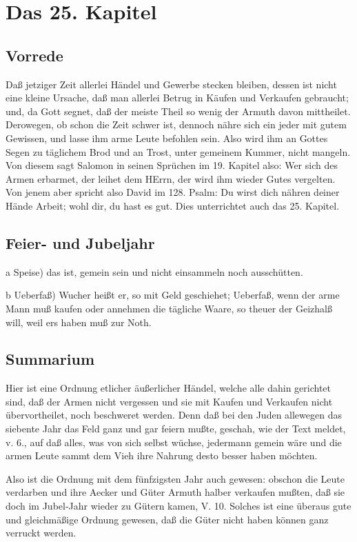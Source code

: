 \chapter{Das 25. Kapitel}

\section{Vorrede}

Daß jetziger Zeit allerlei Händel und Gewerbe stecken bleiben, dessen ist nicht eine kleine Ursache, daß man allerlei Betrug in Käufen und Verkaufen gebraucht; und, da Gott segnet, daß der meiste Theil so wenig der Armuth davon mittheilet. Derowegen, ob schon die Zeit schwer ist, dennoch nähre sich ein jeder mit gutem Gewissen, und lasse ihm arme Leute befohlen sein. Also wird ihm an Gottes Segen zu täglichem Brod und an Trost, unter gemeinem Kummer, nicht mangeln. Von diesem sagt Salomon in seinen Sprüchen im 19. Kapitel also: Wer sich des Armen erbarmet, der leihet dem HErrn, der wird ihm wieder Gutes vergelten. Von jenem aber spricht also David im 128. Psalm: Du wirst dich nähren deiner Hände Arbeit; wohl dir, du hast es gut. Dies unterrichtet auch das 25. Kapitel.

\section{Feier- und Jubeljahr}

a Speise) das ist, gemein sein und nicht einsammeln noch ausschütten.

b Ueberfaß) Wucher heißt er, so mit Geld geschiehet; Ueberfaß, wenn der arme Mann muß kaufen oder annehmen die tägliche Waare, so theuer der Geizhalß will, weil ers haben muß zur Noth.

\section{Summarium}

Hier ist eine Ordnung etlicher äußerlicher Händel, welche alle dahin gerichtet sind, daß der Armen nicht vergessen und sie mit Kaufen und Verkaufen nicht übervortheilet, noch beschweret werden. Denn daß bei den Juden allewegen das siebente Jahr das Feld ganz und gar feiern mußte, geschah, wie der Text meldet, v. 6., auf daß alles, was von sich selbst wüchse, jedermann gemein wäre und die armen Leute sammt dem Vieh ihre Nahrung desto besser haben möchten.


Also ist die Ordnung mit dem fünfzigsten Jahr auch gewesen: obschon die Leute verdarben und ihre Aecker und Güter Armuth halber verkaufen mußten, daß sie doch im Jubel-Jahr wieder zu Gütern kamen, V. 10. Solches ist eine überaus gute und gleichmäßige Ordnung gewesen, daß die Güter nicht haben können ganz verruckt werden.

